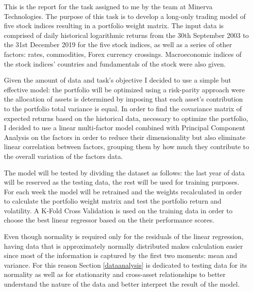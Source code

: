 


This is the report for the task assigned to me by the team at Minerva Technologies. The purpose of this task is to develop a long-only trading model of five stock indices resulting in a portfolio weight matrix. The input data is comprised of daily historical logarithmic returns from the 30th September 2003 to the 31st December 2019 for the five stock indices, as well as a series of other factors: rates, commodities, Forex currency crossings. Macroeconomic indices of the stock indices' countries and fundamentals of the stock were also given.

Given the amount of data and task's objective I decided to use a simple but effective model: the portfolio will be optimized using a risk-parity approach were the allocation of assets is determined by imposing that each asset's contribution to the portfolio total variance is equal. In order to find the covariance matrix of expected returns based on the historical data, necessary to optimize the portfolio, I decided to use a linear multi-factor model combined with Principal Component Analysis on the factors in order to reduce their dimensionality but also eliminate linear correlation between factors, grouping them by how much they contribute to the overall variation of the factors data.

The model will be tested by dividing the dataset as follows: the last year of data will be reserved as the testing data, the rest will be used for training purposes.
For each week the model will be retrained and the weights recalculated in order to calculate the portfolio weight matrix and test the portfolio return and volatility. A K-Fold Cross Validation is used on the training data in order to choose the best linear regressor based on the their performance scores.


Even though normality is required only for the residuals of the linear regression, having data that is approximately normally distributed makes calculation easier since most of the information is captured by the first two moments: mean and variance. For this reason Section \ref{dataanalysis} is dedicated to testing data for its normality as well as for stationarity and cross-asset relationships to better understand the nature of the data and better interpret the result of the model.
